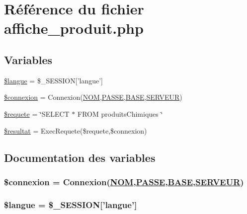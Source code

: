 \hypertarget{affiche__produit_8php}{
\section{R\'{e}f\'{e}rence du fichier affiche\_\-produit.php}
\label{affiche__produit_8php}
}
\subsection*{Variables}
\begin{CompactItemize}
\item 
\hyperlink{affiche__produit_8php_a0}{\$langue} = \$\_\-SESSION\mbox{[}'langue'\mbox{]}
\item 
\hyperlink{affiche__produit_8php_a1}{\$connexion} = Connexion(\hyperlink{pma__connect_8php_a0}{NOM},\hyperlink{pma__connect_8php_a1}{PASSE},\hyperlink{pma__connect_8php_a3}{BASE},\hyperlink{pma__connect_8php_a2}{SERVEUR})
\item 
\hyperlink{affiche__produit_8php_a2}{\$requete} = \char`\"{}SELECT $\ast$ FROM produits\-Chimiques \char`\"{}
\item 
\hyperlink{affiche__produit_8php_a3}{\$resultat} = Exec\-Requete(\$requete,\$connexion)
\end{CompactItemize}


\subsection{Documentation des variables}
\hypertarget{affiche__produit_8php_a1}{
\subsubsection[\$connexion]{\setlength{\rightskip}{0pt plus 5cm}\$connexion = Connexion(\hyperlink{pma__connect_8php_a0}{NOM},\hyperlink{pma__connect_8php_a1}{PASSE},\hyperlink{pma__connect_8php_a3}{BASE},\hyperlink{pma__connect_8php_a2}{SERVEUR})}}
\label{affiche__produit_8php_a1}


\hypertarget{affiche__produit_8php_a0}{
\subsubsection[\$langue]{\setlength{\rightskip}{0pt plus 5cm}\$langue = \$\_\-SESSION\mbox{[}'langue'\mbox{]}}}
\label{affiche__produit_8php_a0}


